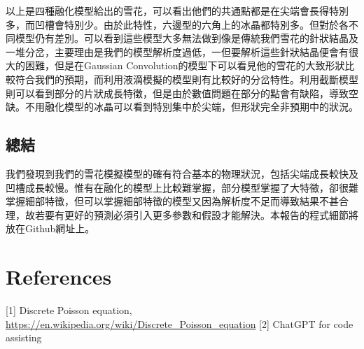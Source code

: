 \documentclass[12pt, a4paper]{article}
\theoremstyle{mystyle}	%
\begin{document}
以上是四種融化模型給出的雪花，可以看出他們的共通點都是在尖端會長得特別多，而凹槽會特別少。由於此特性，六邊型的六角上的冰晶都特別多。但對於各不同模型仍有差別。可以看到這些模型大多無法做到像是傳統我們雪花的針狀結晶及一堆分岔，主要理由是我們的模型解析度過低，一但要解析這些針狀結晶便會有很大的困難，但是在Gaussian Convolution的模型下可以看見他的雪花的大致形狀比較符合我們的預期，而利用液滴模擬的模型則有比較好的分岔特性。利用截斷模型則可以看到部分的片狀成長特徵，但是由於數值問題在部分的點會有缺陷，導致空缺。不用融化模型的冰晶可以看到特別集中於尖端，但形狀完全非預期中的狀況。
\subsection{總結}
我們發現到我們的雪花模擬模型的確有符合基本的物理狀況，包括尖端成長較快及凹槽成長較慢。惟有在融化的模型上比較難掌握，部分模型掌握了大特徵，卻很難掌握細部特徵，但可以掌握細部特徵的模型又因為解析度不足而導致結果不甚合理，故若要有更好的預測必須引入更多參數和假設才能解決。本報告的程式細節將放在Github網址上。
\section*{References}
[1] Discrete Poisson equation, \url{https://en.wikipedia.org/wiki/Discrete_Poisson_equation}
[2] ChatGPT for code assisting
\end{document}

